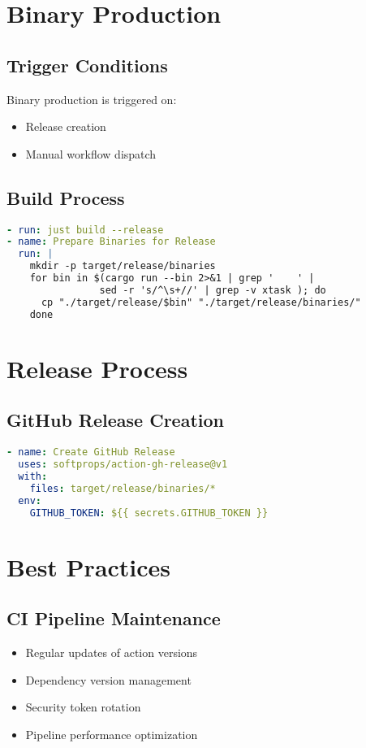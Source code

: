 \documentclass{article}
\begin{document}
\section{Binary Production}

\subsection{Trigger Conditions}
Binary production is triggered on:
\begin{itemize}
    \item Release creation
    \item Manual workflow dispatch
\end{itemize}

\subsection{Build Process}
\begin{lstlisting}[language=yaml]
- run: just build --release
- name: Prepare Binaries for Release
  run: |
    mkdir -p target/release/binaries
    for bin in $(cargo run --bin 2>&1 | grep '    ' | 
                sed -r 's/^\s+//' | grep -v xtask ); do
      cp "./target/release/$bin" "./target/release/binaries/"
    done
\end{lstlisting}

\section{Release Process}

\subsection{GitHub Release Creation}
\begin{lstlisting}[language=yaml]
- name: Create GitHub Release
  uses: softprops/action-gh-release@v1
  with:
    files: target/release/binaries/*
  env:
    GITHUB_TOKEN: ${{ secrets.GITHUB_TOKEN }}
\end{lstlisting}

\section{Best Practices}

\subsection{CI Pipeline Maintenance}
\begin{itemize}
    \item Regular updates of action versions
    \item Dependency version management
    \item Security token rotation
    \item Pipeline performance optimization
\end{itemize}
\end{document}
